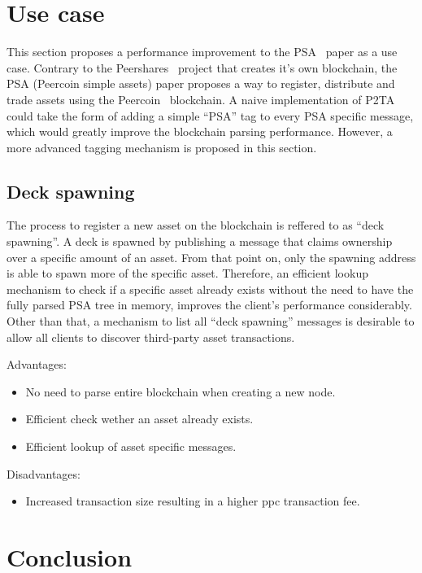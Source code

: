 \documentclass[a4paper,10pt]{article}
\begin{document}
\section{Use case}
This section proposes a performance improvement to the PSA~\cite{Pchem} paper as a use case.
Contrary to the Peershares~\cite{TODO} project that creates it's own blockchain, the PSA (Peercoin simple assets) paper proposes a way to register, distribute and trade assets using the Peercoin~\cite{TODO} blockchain.
A naive implementation of P2TA could take the form of adding a simple ``PSA'' tag to every PSA specific message, which would greatly improve the blockchain parsing performance. However, a more advanced tagging mechanism is proposed in this section.

\subsection{Deck spawning}
The process to register a new asset on the blockchain is reffered to as ``deck spawning''. A deck is spawned by publishing a message that claims ownership over a specific amount of an asset. From that point on, only the spawning address is able to spawn more of the specific asset. Therefore, an efficient lookup mechanism to check if a specific asset already exists without the need to have the fully parsed PSA tree in memory, improves the client's performance considerably. Other than that, a mechanism to list all ``deck spawning'' messages is desirable to allow all clients to discover third-party asset transactions.

Advantages:
\begin{itemize}
 \item No need to parse entire blockchain when creating a new node.
 \item Efficient check wether an asset already exists.
 \item Efficient lookup of asset specific messages.
\end{itemize}

Disadvantages:
\begin{itemize}
 \item Increased transaction size resulting in a higher ppc transaction fee.
\end{itemize}

\section{Conclusion}
\end{document}
